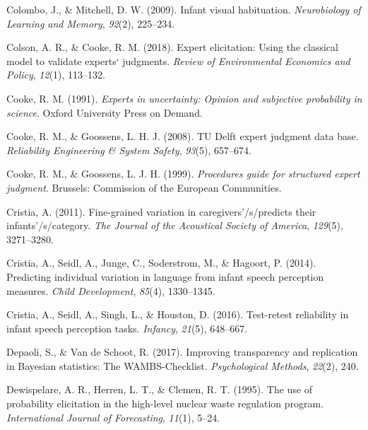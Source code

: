 \documentclass[openright,titlepage,12pt,a4paper]{book}
\begin{document}
\leavevmode\hypertarget{ref-colombo_infant_2009}{}%
Colombo, J., \& Mitchell, D. W. (2009). Infant visual habituation. \emph{Neurobiology of Learning and Memory}, \emph{92}(2), 225--234.

\leavevmode\hypertarget{ref-colson_expert_2018}{}%
Colson, A. R., \& Cooke, R. M. (2018). Expert elicitation: Using the classical model to validate experts` judgments. \emph{Review of Environmental Economics and Policy}, \emph{12}(1), 113--132.

\leavevmode\hypertarget{ref-cooke_experts_1991}{}%
Cooke, R. M. (1991). \emph{Experts in uncertainty: Opinion and subjective probability in science}. Oxford University Press on Demand.

\leavevmode\hypertarget{ref-cooke_tu_2008}{}%
Cooke, R. M., \& Goossens, L. H. J. (2008). TU Delft expert judgment data base. \emph{Reliability Engineering \& System Safety}, \emph{93}(5), 657--674.

\leavevmode\hypertarget{ref-cooke_procedures_1999}{}%
Cooke, R. M., \& Goossens, L. J. H. (1999). \emph{Procedures guide for structured expert judgment}. Brussels: Commission of the European Communities.

\leavevmode\hypertarget{ref-cristia_fine-grained_2011}{}%
Cristia, A. (2011). Fine-grained variation in caregivers'/s/predicts their infants'/s/category. \emph{The Journal of the Acoustical Society of America}, \emph{129}(5), 3271--3280.

\leavevmode\hypertarget{ref-cristia_predicting_2014}{}%
Cristia, A., Seidl, A., Junge, C., Soderstrom, M., \& Hagoort, P. (2014). Predicting individual variation in language from infant speech perception measures. \emph{Child Development}, \emph{85}(4), 1330--1345.

\leavevmode\hypertarget{ref-cristia_test-retest_2016}{}%
Cristia, A., Seidl, A., Singh, L., \& Houston, D. (2016). Test-retest reliability in infant speech perception tasks. \emph{Infancy}, \emph{21}(5), 648--667.

\leavevmode\hypertarget{ref-depaoli_improving_2017}{}%
Depaoli, S., \& Van de Schoot, R. (2017). Improving transparency and replication in Bayesian statistics: The WAMBS-Checklist. \emph{Psychological Methods}, \emph{22}(2), 240.

\leavevmode\hypertarget{ref-dewispelare_use_1995}{}%
Dewispelare, A. R., Herren, L. T., \& Clemen, R. T. (1995). The use of probability elicitation in the high-level nuclear waste regulation program. \emph{International Journal of Forecasting}, \emph{11}(1), 5--24.
\end{document}
